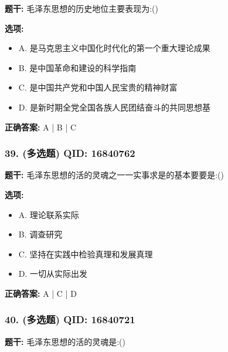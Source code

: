 \documentclass[12pt,UTF8]{ctexart}
\begin{document}
\textbf{题干:}
毛泽东思想的历史地位主要表现为:()

\textbf{选项:}
\begin{itemize}[leftmargin=*]

  \item A. 是马克思主义中国化时代化的第一个重大理论成果

  \item B. 是中国革命和建设的科学指南

  \item C. 是中国共产党和中国人民宝贵的精神财富

  \item D. 是新时期全党全国各族人民团结奋斗的共同思想基

\end{itemize}

\textbf{正确答案:}
A | B | C

\vspace{0.3em}\hrulefill\vspace{0.7em}

\subsubsection*{39. (多选题) \small QID: 16840762}

\textbf{题干:}
毛泽东思想的活的灵魂之一一实事求是的基本要要是:()

\textbf{选项:}
\begin{itemize}[leftmargin=*]

  \item A. 理论联系实际

  \item B. 调查研究

  \item C. 坚持在实践中检验真理和发展真理

  \item D. 一切从实际出发

\end{itemize}

\textbf{正确答案:}
A | C | D

\vspace{0.3em}\hrulefill\vspace{0.7em}

\subsubsection*{40. (多选题) \small QID: 16840721}

\textbf{题干:}
毛泽东思想的活的灵魂是:()
\end{document}

